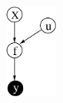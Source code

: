 \documentclass{beamer}
\begin{document}
{\begin{columns}
\begin{column}[t]{8cm}
\begin{itemize}
\end{itemize}
\end{column}
\begin{column}[t]{3cm}
\begin{figure}
\includegraphics[width=20mm,height=30mm]{../../../vargplvm/tex/diagrams/net2}
\end{figure}
\end{column}
\end{columns}

}



%
%
%
%
%
%
%
%
%
%
\end{document}
